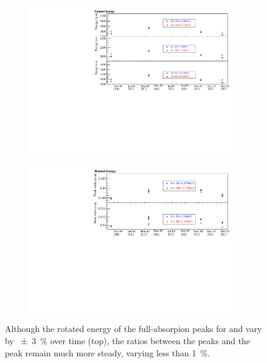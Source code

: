 \documentclass[herrin-thesis.tex]{subfiles}
\begin{document}
\begin{figure}[htb]
\centering
\begin{subfigure}[b]{0.75\textwidth}
\centering
\includegraphics[width=\textwidth]{./plots/data_peak_energy_v_time.pdf}
\end{subfigure}
\begin{subfigure}[b]{0.75\textwidth}
\centering
\includegraphics[width=1\textwidth]{./plots/data_peak_ratio_v_time.pdf}
\end{subfigure}
\caption[Variation of full-absorption peak energies and peak energy ratios over time]{Although the rotated energy of the full-absorpion peaks for  and  vary by \about{}\SI{\pm3}{\percent} over time (top), the ratios between the  peaks and the  peak remain much more steady, varying less than \SI{1}{\percent}.}
\label{fig:data_energy_ratios_time}
\end{figure}
\end{document}
